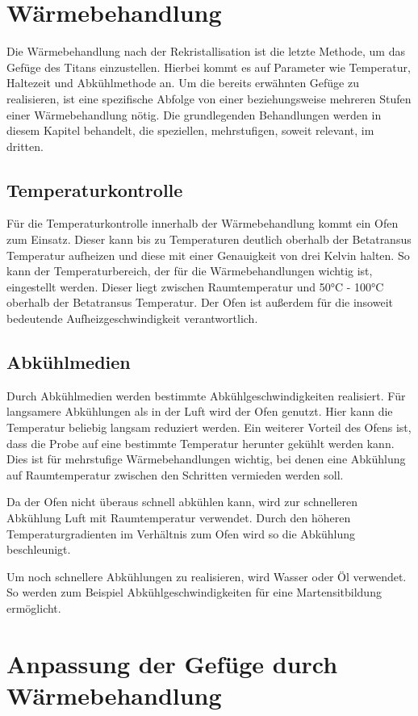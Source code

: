 \documentclass[a4paper, 11pt]{tubsreprt}
\begin{document}
\section{Wärmebehandlung}

Die Wärmebehandlung nach der Rekristallisation ist die letzte Methode, um das Gefüge des Titans einzustellen. Hierbei kommt es auf Parameter wie Temperatur, Haltezeit und Abkühlmethode an. Um die bereits erwähnten Gefüge zu realisieren, ist eine spezifische Abfolge von einer beziehungsweise mehreren Stufen einer Wärmebehandlung nötig. Die grundlegenden Behandlungen werden in diesem Kapitel behandelt, die speziellen, mehrstufigen, soweit relevant, im dritten.
\subsection{Temperaturkontrolle}
Für die Temperaturkontrolle innerhalb der Wärmebehandlung kommt ein Ofen zum Einsatz. Dieser kann bis zu Temperaturen deutlich oberhalb der Betatransus Temperatur aufheizen und diese mit einer Genauigkeit von drei Kelvin halten. So kann der Temperaturbereich, der für die Wärmebehandlungen wichtig ist, eingestellt werden. Dieser liegt zwischen Raumtemperatur und 50°C - 100°C oberhalb der Betatransus Temperatur. Der Ofen ist außerdem für die insoweit bedeutende Aufheizgeschwindigkeit verantwortlich.

\subsection{Abkühlmedien}

Durch Abkühlmedien werden bestimmte Abkühlgeschwindigkeiten realisiert. Für langsamere Abkühlungen als in der Luft wird der Ofen genutzt. Hier kann die Temperatur beliebig langsam reduziert werden. Ein weiterer Vorteil des Ofens ist, dass die Probe auf eine bestimmte Temperatur herunter gekühlt werden kann. Dies ist für mehrstufige Wärmebehandlungen wichtig, bei denen eine Abkühlung auf Raumtemperatur zwischen den Schritten vermieden werden soll. 

Da der Ofen nicht überaus schnell abkühlen kann, wird zur schnelleren Abkühlung Luft mit Raumtemperatur verwendet. Durch den höheren Temperaturgradienten im Verhältnis zum Ofen wird so die Abkühlung beschleunigt.  

Um noch schnellere Abkühlungen zu realisieren, wird Wasser oder Öl verwendet. So werden zum Beispiel Abkühlgeschwindigkeiten für eine Martensitbildung ermöglicht.
\section{Anpassung der Gefüge durch Wärmebehandlung}
\end{document}
